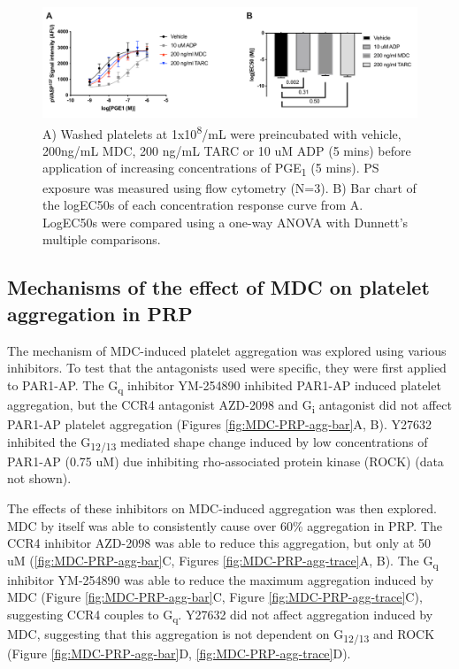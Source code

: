 \documentclass[11pt,twoside]{bristolthesis}
\begin{document}
\begin{figure}
\includegraphics[width=0.9\linewidth]{figure/Chemokines/Layouts/MDC_TARC_VASP_FACS_logec50} \caption[The effect of the chemokines MDC and TARC on phospho-VASP levels]{A) Washed platelets at 1x10\textsuperscript{8}/mL were preincubated with vehicle, 200ng/mL MDC, 200 ng/mL TARC or 10 uM ADP (5 mins) before application of increasing concentrations of PGE\textsubscript{1} (5 mins). PS exposure was measured using flow cytometry (N=3). B) Bar chart of the logEC50s of each concentration response curve from A. LogEC50s were compared using a one-way ANOVA with Dunnett's multiple comparisons.}\label{fig:MDC-TARC-VASP-FACS}
\end{figure}
\hypertarget{mechanisms-of-the-effect-of-mdc-on-platelet-aggregation-in-prp}{%
\subsection{Mechanisms of the effect of MDC on platelet aggregation in PRP}\label{mechanisms-of-the-effect-of-mdc-on-platelet-aggregation-in-prp}}

The mechanism of MDC-induced platelet aggregation was explored using various inhibitors. To test that the antagonists used were specific, they were first applied to PAR1-AP. The G\textsubscript{q} inhibitor YM-254890 inhibited PAR1-AP induced platelet aggregation, but the CCR4 antagonist AZD-2098 and G\textsubscript{i} antagonist did not affect PAR1-AP platelet aggregation (Figures \ref{fig:MDC-PRP-agg-bar}A, B). Y27632 inhibited the G\textsubscript{12/13} mediated shape change induced by low concentrations of PAR1-AP (0.75 uM) due inhibiting rho-associated protein kinase (ROCK) (data not shown).

The effects of these inhibitors on MDC-induced aggregation was then explored. MDC by itself was able to consistently cause over 60\% aggregation in PRP. The CCR4 inhibitor AZD-2098 was able to reduce this aggregation, but only at 50 uM (\ref{fig:MDC-PRP-agg-bar}C, Figures \ref{fig:MDC-PRP-agg-trace}A, B). The G\textsubscript{q} inhibitor YM-254890 was able to reduce the maximum aggregation induced by MDC (Figure \ref{fig:MDC-PRP-agg-bar}C, Figure \ref{fig:MDC-PRP-agg-trace}C), suggesting CCR4 couples to G\textsubscript{q}. Y27632 did not affect aggregation induced by MDC, suggesting that this aggregation is not dependent on G\textsubscript{12/13} and ROCK (Figure \ref{fig:MDC-PRP-agg-bar}D, \ref{fig:MDC-PRP-agg-trace}D).
\end{document}
